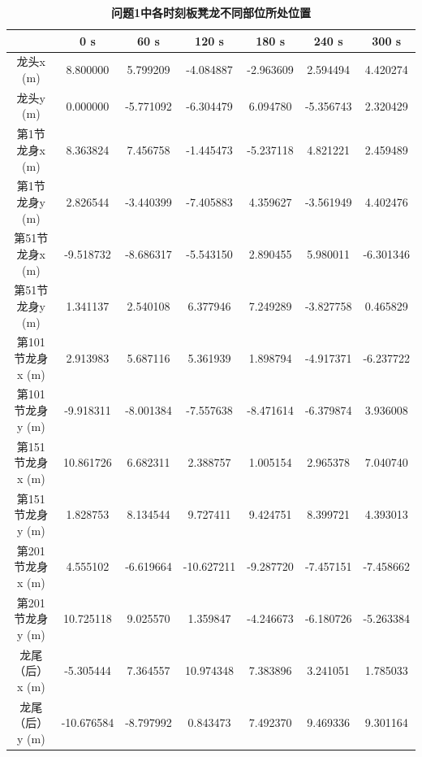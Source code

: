 \documentclass[zihao=-4, UTF8]{article}		%
\theoremstyle{MyLineTheoremStyle} %
\theoremstyle{MyBlockTheoremStyle} %
\theoremstyle{MySubsubsectionStyle} %
\begin{document}
\begin{table}[H]
    \centering\small
    \caption{\textbf{问题1中各时刻板凳龙不同部位所处位置}}
    \label{问题1位置结果}
    \begin{tabular}{|c|c|c|c|c|c|c|}
        \hline
         & 0 s & 60 s & 120 s & 180 s & 240 s & 300 s\\ \hline
        龙头x (m) &8.800000&5.799209&-4.084887&-2.963609&2.594494&4.420274
        \\ \hline
        龙头y (m) &0.000000&-5.771092&-6.304479&6.094780&-5.356743
        &2.320429
        \\ \hline
        第1节龙身x (m) &8.363824&7.456758&-1.445473&-5.237118&4.821221&2.459489\\ \hline
        第1节龙身y (m) &2.826544&-3.440399&-7.405883&4.359627&-3.561949&4.402476\\ \hline
        第51节龙身x (m) &-9.518732&-8.686317&-5.543150&2.890455&5.980011&-6.301346
        \\ \hline
        第51节龙身y (m) &1.341137&2.540108&6.377946&7.249289&-3.827758&0.465829\\ \hline
        第101节龙身x (m) &2.913983&5.687116&5.361939&1.898794&-4.917371&-6.237722\\ \hline
        第101节龙身y (m) &-9.918311&-8.001384&-7.557638&-8.471614&-6.379874&3.936008\\ \hline
        第151节龙身x (m) &10.861726&6.682311&2.388757&1.005154&2.965378&7.040740\\ \hline
        第151节龙身y (m) &1.828753&8.134544&9.727411&9.424751&8.399721&4.393013\\ \hline
        第201节龙身x (m) &4.555102&-6.619664&-10.627211&-9.287720&-7.457151&-7.458662\\ \hline
        第201节龙身y (m) &10.725118&9.025570&1.359847&-4.246673&-6.180726&-5.263384\\ \hline
        龙尾（后）x (m) &-5.305444&7.364557&10.974348&7.383896&3.241051&1.785033\\ \hline
        龙尾（后）y (m) &-10.676584&-8.797992&0.843473&7.492370&9.469336&9.301164\\ \hline
        
    \end{tabular}
\end{table}
\end{document}
